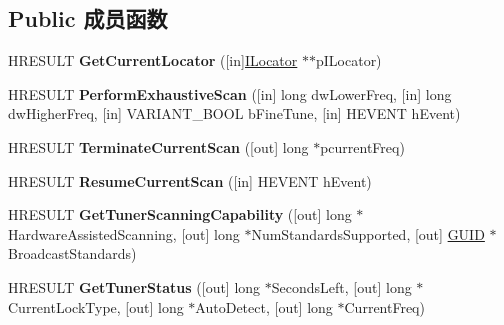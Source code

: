 \subsection*{Public 成员函数}
\begin{DoxyCompactItemize}
\item 
\mbox{\label{interface_i_scanning_tuner_ex_a45501c7c11e38e23d95fc4b5a82094eb}} 
H\+R\+E\+S\+U\+LT {\bfseries Get\+Current\+Locator} (\mbox{[}in\mbox{]}\hyperlink{interface_i_locator}{I\+Locator} $\ast$$\ast$p\+I\+Locator)
\item 
\mbox{\label{interface_i_scanning_tuner_ex_a45eaf11c72ad27183771b57460d54066}} 
H\+R\+E\+S\+U\+LT {\bfseries Perform\+Exhaustive\+Scan} (\mbox{[}in\mbox{]} long dw\+Lower\+Freq, \mbox{[}in\mbox{]} long dw\+Higher\+Freq, \mbox{[}in\mbox{]} V\+A\+R\+I\+A\+N\+T\+\_\+\+B\+O\+OL b\+Fine\+Tune, \mbox{[}in\mbox{]} H\+E\+V\+E\+NT h\+Event)
\item 
\mbox{\label{interface_i_scanning_tuner_ex_a514b895cba23e1b3bef09c2976ae5ecf}} 
H\+R\+E\+S\+U\+LT {\bfseries Terminate\+Current\+Scan} (\mbox{[}out\mbox{]} long $\ast$pcurrent\+Freq)
\item 
\mbox{\label{interface_i_scanning_tuner_ex_a774d6ddea1d29ecd37dbbdf57618c992}} 
H\+R\+E\+S\+U\+LT {\bfseries Resume\+Current\+Scan} (\mbox{[}in\mbox{]} H\+E\+V\+E\+NT h\+Event)
\item 
\mbox{\label{interface_i_scanning_tuner_ex_a32132ab99727f63f9e608c8fa77b85df}} 
H\+R\+E\+S\+U\+LT {\bfseries Get\+Tuner\+Scanning\+Capability} (\mbox{[}out\mbox{]} long $\ast$Hardware\+Assisted\+Scanning, \mbox{[}out\mbox{]} long $\ast$Num\+Standards\+Supported, \mbox{[}out\mbox{]} \hyperlink{interface_g_u_i_d}{G\+U\+ID} $\ast$Broadcast\+Standards)
\item 
\mbox{\label{interface_i_scanning_tuner_ex_a5bcf97cdcbca9f0fb8b352a8b11de1f2}} 
H\+R\+E\+S\+U\+LT {\bfseries Get\+Tuner\+Status} (\mbox{[}out\mbox{]} long $\ast$Seconds\+Left, \mbox{[}out\mbox{]} long $\ast$Current\+Lock\+Type, \mbox{[}out\mbox{]} long $\ast$Auto\+Detect, \mbox{[}out\mbox{]} long $\ast$Current\+Freq)
\item 
$$
\end{DoxyCompactItemize}
